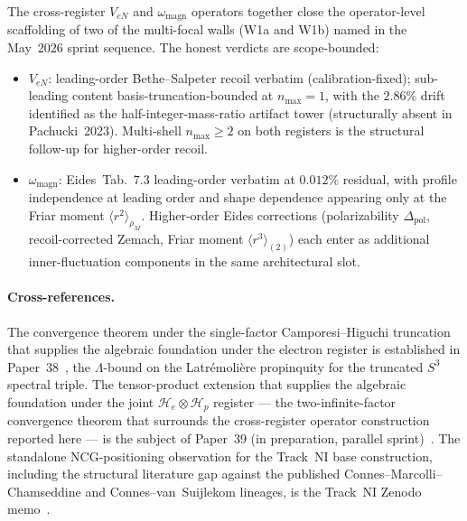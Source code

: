 \documentclass[twocolumn,prc,amsmath,amssymb,superscriptaddress]{revtex4-2}
\begin{document}
The cross-register $V_{eN}$ and $\omega_{\mathrm{magn}}$ operators
together close the operator-level scaffolding of two of the multi-focal
walls (W1a and W1b) named in the May~2026 sprint sequence. The honest
verdicts are scope-bounded:
\begin{itemize}
  \item $V_{eN}$: leading-order Bethe--Salpeter recoil verbatim
    (calibration-fixed); sub-leading content basis-truncation-bounded
    at $n_{\max} = 1$, with the $2.86\%$ drift identified as the
    half-integer-mass-ratio artifact tower (structurally absent in
    Pachucki~2023). Multi-shell $n_{\max} \geq 2$ on both registers is
    the structural follow-up for higher-order recoil.
  \item $\omega_{\mathrm{magn}}$: Eides~Tab.~7.3 leading-order verbatim
    at $0.012\%$ residual, with profile independence at leading order
    and shape dependence appearing only at the Friar moment
    $\langle r^2\rangle_{\rho_M}$. Higher-order Eides corrections
    (polarizability $\Delta_{\mathrm{pol}}$, recoil-corrected Zemach,
    Friar moment $\langle r^3\rangle_{(2)}$) each enter as additional
    inner-fluctuation components in the same architectural slot.
\end{itemize}

\paragraph{Cross-references.}
The convergence theorem under the single-factor Camporesi--Higuchi
truncation that supplies the algebraic foundation under the electron
register is established in Paper~38~\cite{Paper38}, the
$\Lambda$-bound on the Latrémolière propinquity for the truncated
$S^3$ spectral triple. The tensor-product extension that supplies the
algebraic foundation under the joint $\mathcal{H}_e \otimes
\mathcal{H}_p$ register --- the two-infinite-factor convergence theorem
that surrounds the cross-register operator construction reported here
--- is the subject of Paper~39 (in preparation, parallel
sprint)~\cite{Paper39}. The standalone NCG-positioning observation for
the Track~NI base construction, including the structural literature
gap against the published Connes--Marcolli--Chamseddine and
Connes--van~Suijlekom lineages, is the Track~NI Zenodo
memo~\cite{TrackNiZenodo}.
\end{document}
